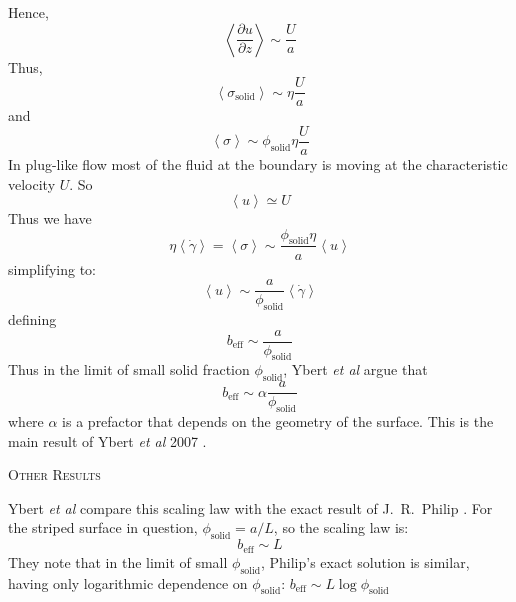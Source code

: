\documentclass[12pt, a4paper, twoside, openright]{book}
\newcommand{\beff}{\ensuremath{b_{\mathrm{eff}}}}
\newcommand{\phisol}{\ensuremath{\phi_{\mathrm{solid}}}}
\newcommand{\sigsol}{\ensuremath{\sigma_{\mathrm{solid}}}}
\newcommand{\gamsol}{\ensuremath{ \dot{\gamma}_{\mathrm{solid}} }}
\begin{document}
Hence,
\begin{equation}
\left< \frac{\partial u}{\partial z} \right> \sim \frac{U}{a}
\end{equation}
Thus, 
\begin{equation}
\left< \sigsol \right> \sim \eta \frac{U}{a}
\end{equation}
and
\begin{equation}
\left< \sigma \right> \sim \phisol \eta \frac{U}{a}
\end{equation}
In plug-like flow most of the fluid at the boundary is moving at the characteristic velocity $U$. So
\begin{equation}
\left< u \right> \simeq U
\end{equation}
Thus we have
\begin{equation}
\eta \left< \dot{\gamma} \right> = \left< \sigma \right> \sim
  \frac{ \phisol \eta} {a} \left< u \right>
\end{equation}
simplifying to:
\begin{equation}
\left< u \right> \sim \frac{a}{\phisol}  \left< \dot{\gamma} \right>
\end{equation}
defining
\begin{equation}
\beff \sim  \frac{a}{\phisol} 
\end{equation}
Thus in the limit of small solid fraction $\phisol$, Ybert \emph{et al} argue that
\begin{equation}
\beff \sim \alpha  \frac{a}{\phisol} 
\end{equation}
where $\alpha$ is a prefactor that depends on the geometry of the surface.  This is the main result of Ybert \emph{et al} 2007 \cite{Ybert2007}.


\vspace{1em}
\colorbox[gray]{0.8}{ \textsc{Other Results} }
\vspace{0.5em}


Ybert \emph{et al} compare this scaling law with the exact result of J.\ R.\ Philip \cite{Philip1972}.  For the striped surface in question, $\phisol = a/L$, so the scaling law is:
\begin{equation}
\beff \sim L
\end{equation}
They note that in the limit of small $\phisol$, Philip's exact solution is similar, having only logarithmic dependence on $\phisol$: $\beff \sim L \log \phisol $
\end{document}
